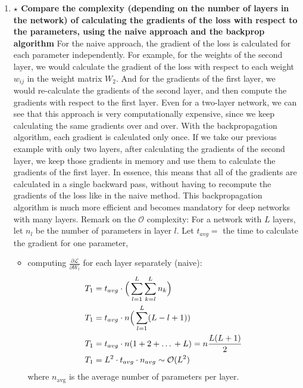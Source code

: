 \documentclass[12pt,a4paper]{article}
\begin{document}
\begin{enumerate}[resume]
    \item \textbf{$\star$ Compare the complexity (depending on the number of layers in the network) of calculating the
            gradients of the loss with respect to the parameters, using the naive approach and the backprop algorithm} \newline
    For the naive approach, the gradient of the loss is calculated for each parameter independently. 
    For example, for the weights of the second layer, we would calculate the gradient of the loss with respect to each weight $w_{ij}$ in 
    the weight matrix $W_2$. And for the gradients of the first layer, we would re-calculate the gradients of the second layer, 
    and then compute the gradients with respect to the first layer. Even for a two-layer network, we can see that this approach is very computationally 
    expensive, since we keep calculating the same gradients over and over. \newline
    With the backpropagation algorithm, each gradient is calculated only once. If we take our previous example with only two layers, 
    after calculating the gradients of the second layer, we keep those gradients in memory and use them to calculate the gradients of the first layer. 
    In essence, this means that all of the gradients are calculated in a single backward pass, 
    without having to recompute the gradients of the loss like in the naive method. \newline
    This backpropagation algorithm is much more efficient and becomes mandatory for deep networks with many layers. \newline
    Remark on the $\mathcal{O}$ complexity: \newline
    For a network with $L$ layers, let $n_l$ be the number of parameters in layer $l$.  \newline
    Let $t_{avg} = $ the time to calculate the gradient for one parameter,

    \begin{itemize}
        \item computing $\frac{\partial \mathcal{L}}{\partial W_l}$ for each layer separately (naive):  
        \begin{align*}
            T_1 &= t_{avg} \cdot \Big(\sum_{l=1}^L \sum_{k=l}^L n_k\Big) \\
            T_1 &= t_{avg} \cdot n \Big(\sum_{l=1}^{L} (L - l + 1)) \\
            T_1 &= t_{avg} \cdot n(1 + 2 + \text{\dots} + L) = n \frac{L(L+1)}{2} \\
            T_1 &= L^2 \cdot t_{avg} \cdot n_{avg} \sim \mathcal{O}(L^2)
        \end{align*} 
        where $n_\text{avg}$ is the average number of parameters per layer.  


\end{itemize}
\end{enumerate}
\end{document}
